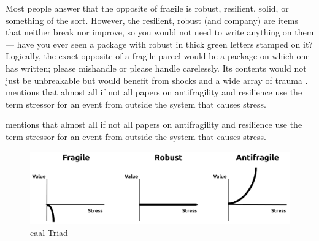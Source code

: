 Most people answer that the opposite of \gls{fragile} is \gls{robust}, \gls{resilient}, solid, or something of the sort. However, the \gls{resilient}, \gls{robust} (and company) are items that neither break nor improve, so you would not need to write anything on them — have you ever seen a package with \gls{robust} in thick green letters stamped on it? Logically, the exact opposite of a \gls{fragile} parcel would be a package on which one has written; please mishandle or please handle carelessly. Its contents would not just be unbreakable but would benefit from shocks and a wide array of trauma \parencite{Taleb2012}. \textcite[p. 32]{Botjes2020} mentions that almost all if not all papers on antifragility and resilience use the term stressor for an event from outside the system that causes stress.



\textcite[p. 32]{Botjes2020} mentions that almost all if not all papers on antifragility and resilience use the term stressor for an event from outside the system that causes stress. 

\begin{figure}[h!]
	\centering
	\includegraphics[width=0.7\linewidth]{images/eaal-triad}
	\caption[EAAL Triad]{\acrfull{eaal} Triad \parencite{Botjes2020}}
	\label{fig:eaal-triad}
\end{figure}